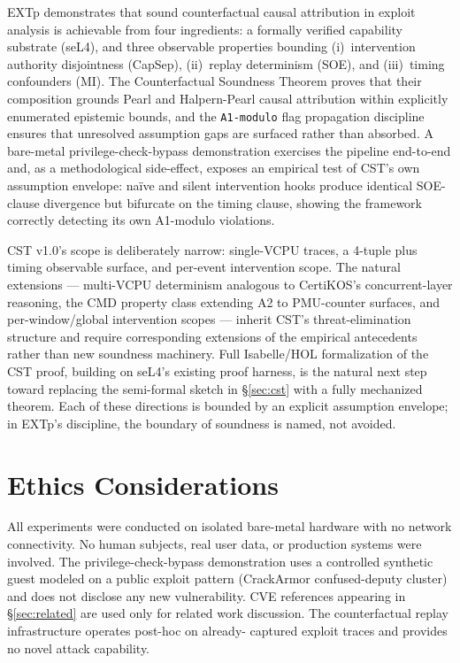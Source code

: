 \documentclass[conference]{IEEEtran}
\begin{document}
EXTp demonstrates that sound counterfactual causal attribution in
exploit analysis is achievable from four ingredients: a formally
verified capability substrate (seL4), and three observable
properties bounding (i)~intervention authority disjointness
(CapSep), (ii)~replay determinism (SOE), and (iii)~timing
confounders (MI). The Counterfactual Soundness Theorem proves that
their composition grounds Pearl and Halpern-Pearl causal
attribution within explicitly enumerated epistemic bounds, and the
\texttt{A1-modulo} flag propagation discipline ensures that
unresolved assumption gaps are surfaced rather than absorbed. A
bare-metal privilege-check-bypass demonstration exercises the
pipeline end-to-end and, as a methodological side-effect, exposes
an empirical test of CST's own assumption envelope: naïve and
silent intervention hooks produce identical SOE-clause divergence
but bifurcate on the timing clause, showing the framework
correctly detecting its own A1-modulo violations.

CST v1.0's scope is deliberately narrow: single-VCPU traces, a
4-tuple plus timing observable surface, and per-event intervention
scope. The natural extensions --- multi-VCPU determinism analogous
to CertiKOS's concurrent-layer reasoning, the CMD property class
extending A2 to PMU-counter surfaces, and per-window/global
intervention scopes --- inherit CST's threat-elimination structure
and require corresponding extensions of the empirical antecedents
rather than new soundness machinery. Full Isabelle/HOL formalization
of the CST proof, building on seL4's existing proof harness, is
the natural next step toward replacing the semi-formal sketch in
\S\ref{sec:cst} with a fully mechanized theorem. Each of these
directions is bounded by an explicit assumption envelope; in
EXTp's discipline, the boundary of soundness is named, not avoided.

\section*{Ethics Considerations}

All experiments were conducted on isolated bare-metal hardware with
no network connectivity. No human subjects, real user data, or
production systems were involved. The privilege-check-bypass
demonstration uses a controlled synthetic guest modeled on a public
exploit pattern (CrackArmor confused-deputy cluster) and does not
disclose any new vulnerability. CVE references appearing in
\S\ref{sec:related} are used only for related work discussion. The
counterfactual replay infrastructure operates post-hoc on already-
captured exploit traces and provides no novel attack capability.
\end{document}
